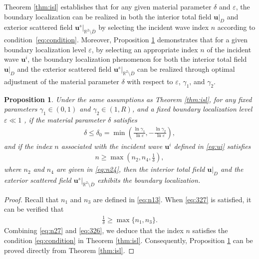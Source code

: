 \documentclass[11pt,reqno,twoside]{amsart}
\newtheorem{prop}{Proposition}[section]
\theoremstyle{definition}
\theoremstyle{remark}
\numberwithin{equation}{section}
\begin{document}
Theorem \ref{thm:isl} establishes that for any given material parameter $\delta$ and  $\varepsilon$, the boundary localization can be realized in both the interior total field $\mathbf{u}|_D$ and exterior scattered field $\mathbf{u}^s|_{\mathbb{R}^2\setminus\overline{D}}$ by selecting the incident wave index $n$ according to condition~\eqref{eq:condition}. Moreover, Proposition \ref{cor:isl} demonstrates that for a given boundary localization level $\varepsilon$, by selecting an appropriate index $n$ of the incident wave $\mathbf{u}^i$, the boundary localization phenomenon for both the interior total field $\mathbf{u}|_D$ and the exterior scattered field $\mathbf{u}^s|_{\mathbb{R}^2 \setminus \overline{D}}$ can be realized through optimal adjustment of the material parameter $\delta$ with respect to $\varepsilon$, $\gamma_1$, and $\gamma_2$.
\begin{prop}\label{cor:isl}
	Under the same assumptions as  Theorem \ref{thm:isl}, for any fixed parameters $\gamma_1 \in (0,1)$ and $\gamma_2 \in (1,R)$, and a fixed boundary localization level $\varepsilon \ll 1$ , if the material parameter $\delta$ satisfies
	\begin{align}\label{eq:327}
		\delta \leq \delta_{0}=\min\left(\frac{\ln\gamma_{1}}{\ln\varepsilon},-\frac{\ln\gamma_{2}}{\ln\varepsilon}\right),
	\end{align}
	and if the index $n$ associated with the incident wave $\mathbf{u}^i$ defined in \eqref{eq:ui} satisfies
	\begin{align}\label{eq:n27}
		n\geq\max\left({n_{2},n_{4}, \frac{1}{\delta}}\right),
	\end{align}
	where $n_{2}$ and $n_{4}$ are given in \eqref{eq:n24}, then the interior total field $\mathbf{u}|_D$ and the exterior scattered field $\mathbf{u}^s|_{\mathbb{R}^2 \setminus \overline{D}}$ exhibits the boundary localization.
\end{prop}


\begin{proof}
	Recall that $n_1$ and $n_3$ are defined in \eqref{eq:n13}. When \eqref{eq:327} is satisfied, it can be verified that 
	\begin{align}\label{eq:326}
		\frac{1}{\delta} \geq \max\{n_1, n_3\}. 
	\end{align}
	Combining \eqref{eq:n27} and \eqref{eq:326}, we deduce that the index $n$ satisfies the condition \eqref{eq:condition} in Theorem \ref{thm:isl}. Consequently,  Proposition \ref{cor:isl} can be proved directly from  Theorem \ref{thm:isl}. 
\end{proof}
\end{document}
